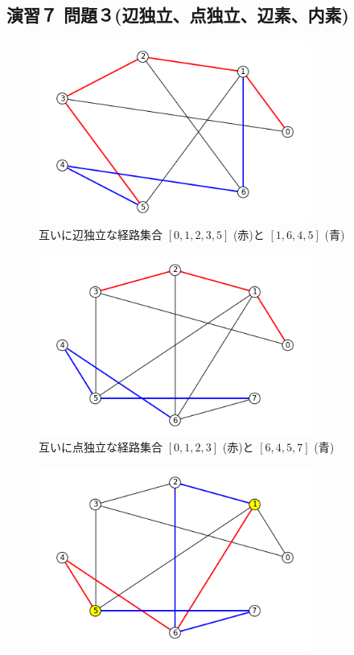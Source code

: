 \documentclass{report}
\begin{document}
\begin{CJK}{UTF8}{min}
    \section*{演習７ 問題３(辺独立、点独立、辺素、内素)}
    \begin{figure}[!h]
        \centerline{\includegraphics[width=0.8\textwidth]{data/7.png}}
        \caption{互いに辺独立な経路集合 $[0,1,2,3,5]$ (赤)と $[1,6,4,5]$ (青)}
    \end{figure}
    \begin{figure}[!h]
        \centerline{\includegraphics[width=0.8\textwidth]{data/8.png}}
        \caption{互いに点独立な経路集合 $[0,1,2,3]$ (赤)と $[6,4,5,7]$ (青)}
    \end{figure}
    \begin{figure}[!h]
        \centerline{\includegraphics[width=0.8\textwidth]{data/9.png}}

\end{figure}
\end{CJK}
\end{document}
